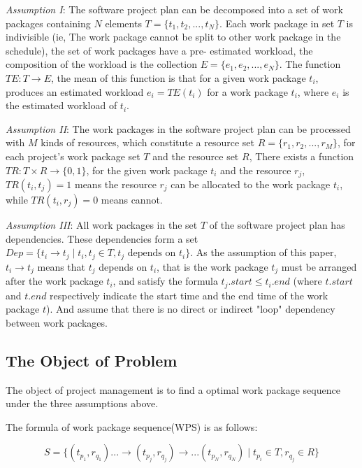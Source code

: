 \emph{Assumption I}: The software project plan can be decomposed into a set 
of work packages containing $N$ elements $T = \{t_1, t_2, ..., t_N \}$.  Each 
work package in set $T$ is indivisible (ie, The work package cannot be split 
to other work package in the schedule), the set of work packages have a pre-
estimated workload, the composition of the workload is the collection $E = \{e
_1, e_2, ..., e_N \}$. The function $TE: T \rightarrow E$, the mean of this 
function is that for a given work package $t_i$, produces an estimated 
workload $e_i = TE(t_i)$ for a work package $t_i$, where $e_i$ is the 
estimated workload of $t_i$. 

\emph{Assumption II}: The work packages in the software project plan
can be processed with $M$ kinds of resources, which constitute a
resource set $R = \{r_1, r_2, ..., r_M \}$, for each project's work
package set $T$ and the resource set $R$, There exists a function
$TR: T \times R \rightarrow \{0, 1\}$, for the given work package $t_i$
and the resource $r_j$, $TR(t_i, t_j) = 1$ means the resource $r_j$ can
be allocated to the work package $t_i$, while $TR (t_i, r_j) = 0$ means
cannot.


\emph{Assumption III}: All work packages in the set $T$ of the
software project plan has dependencies. These dependencies form a set
$Dep= \{t_i \rightarrow t_j \mid t_i, t_j \in T, t_j \text{ depends on } t_i\}$.
As the assumption of this paper, $t_i \rightarrow t_j$ means that
$t_j$ depends on $t_i$, that is the work package $t_j$ must be
arranged after the work package $t_i$, and satisfy the formula
$t_j.start \leq t_i.end$ (where $t.start$ and $t.end$ respectively
indicate the start time and the end time of the work package $t$).
And assume that there is no direct or indirect "loop" dependency
between work packages.


\subsection{The Object of Problem}
%
The object of project management is to find a optimal work package sequence
under the three assumptions above.

The formula of work package sequence(WPS) is as follows:

\begin{equation}
  S = \{
  (t_{p_1}, r_{q_1}) ... \rightarrow (t_{p_j}, r_{q_j}) \rightarrow ... (t_{p_N}, r_{q_N})
  \mid t_{p_i} \in T, r_{q_j} \in R
  \}
  \label{wps}
\end{equation}

